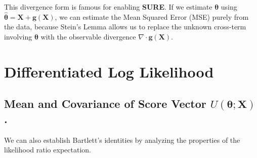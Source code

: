 \documentclass[
  letterpaper,
  DIV=11,
  numbers=noendperiod]{scrreprt}
\renewcommand{\[}{\begin{equation}}
\renewcommand{\]}{\end{equation}}
\theoremstyle{definition}
\theoremstyle{plain}
\theoremstyle{plain}
\theoremstyle{plain}
\theoremstyle{definition}
\theoremstyle{plain}
\theoremstyle{remark}
\begin{document}
\begin{tcolorbox}[enhanced jigsaw, toptitle=1mm, arc=.35mm, left=2mm, toprule=.15mm, bottomtitle=1mm, opacityback=0, rightrule=.15mm, title=\textcolor{quarto-callout-note-color}{\faInfo}\hspace{0.5em}{Significance: Stein's Unbiased Risk Estimate (SURE)}, colback=white, coltitle=black, titlerule=0mm, colbacktitle=quarto-callout-note-color!10!white, breakable, leftrule=.75mm, bottomrule=.15mm, opacitybacktitle=0.6, colframe=quarto-callout-note-color-frame]

This divergence form is famous for enabling \textbf{SURE}. If we
estimate \(\boldsymbol{\theta}\) using
\(\hat{\boldsymbol{\theta}} = \mathbf{X} + \mathbf{g}(\mathbf{X})\), we
can estimate the Mean Squared Error (MSE) purely from the data, because
Stein's Lemma allows us to replace the unknown cross-term involving
\(\boldsymbol{\theta}\) with the observable divergence
\(\nabla \cdot \mathbf{g}(\mathbf{X}).\)

\end{tcolorbox}

\section{Differentiated Log
Likelihood}\label{differentiated-log-likelihood}

\subsection{\texorpdfstring{Mean and Covariance of Score Vector
\(U(\boldsymbol{\theta};\mathbf{X})\).}{Mean and Covariance of Score Vector U(\textbackslash boldsymbol\{\textbackslash theta\};\textbackslash mathbf\{X\}).}}\label{mean-and-covariance-of-score-vector-uboldsymbolthetamathbfx.}

We can also establish Bartlett's identities by analyzing the properties
of the likelihood ratio expectation.
\end{document}
